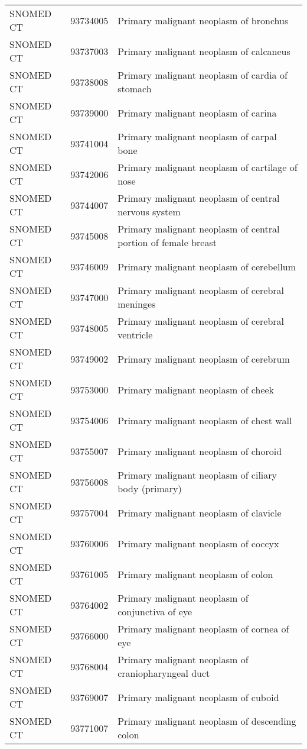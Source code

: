 \begin{longtable}{p{}p{}p{}}
  SNOMED CT & 93734005 & Primary malignant neoplasm of bronchus \\ 
  SNOMED CT & 93737003 & Primary malignant neoplasm of calcaneus \\ 
  SNOMED CT & 93738008 & Primary malignant neoplasm of cardia of stomach \\ 
  SNOMED CT & 93739000 & Primary malignant neoplasm of carina \\ 
  SNOMED CT & 93741004 & Primary malignant neoplasm of carpal bone \\ 
  SNOMED CT & 93742006 & Primary malignant neoplasm of cartilage of nose \\ 
  SNOMED CT & 93744007 & Primary malignant neoplasm of central nervous system \\ 
  SNOMED CT & 93745008 & Primary malignant neoplasm of central portion of female breast \\ 
  SNOMED CT & 93746009 & Primary malignant neoplasm of cerebellum \\ 
  SNOMED CT & 93747000 & Primary malignant neoplasm of cerebral meninges \\ 
  SNOMED CT & 93748005 & Primary malignant neoplasm of cerebral ventricle \\ 
  SNOMED CT & 93749002 & Primary malignant neoplasm of cerebrum \\ 
  SNOMED CT & 93753000 & Primary malignant neoplasm of cheek \\ 
  SNOMED CT & 93754006 & Primary malignant neoplasm of chest wall \\ 
  SNOMED CT & 93755007 & Primary malignant neoplasm of choroid \\ 
  SNOMED CT & 93756008 & Primary malignant neoplasm of ciliary body (primary) \\ 
  SNOMED CT & 93757004 & Primary malignant neoplasm of clavicle \\ 
  SNOMED CT & 93760006 & Primary malignant neoplasm of coccyx \\ 
  SNOMED CT & 93761005 & Primary malignant neoplasm of colon \\ 
  SNOMED CT & 93764002 & Primary malignant neoplasm of conjunctiva of eye \\ 
  SNOMED CT & 93766000 & Primary malignant neoplasm of cornea of eye \\ 
  SNOMED CT & 93768004 & Primary malignant neoplasm of craniopharyngeal duct \\ 
  SNOMED CT & 93769007 & Primary malignant neoplasm of cuboid \\ 
  SNOMED CT & 93771007 & Primary malignant neoplasm of descending colon \\ 

\end{longtable}
